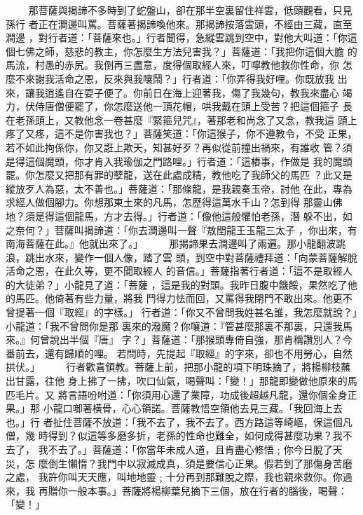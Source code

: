 \begin{pinyinscope}
{　　
那菩薩與揭諦不多時到了蛇盤山，卻在那半空裏留住祥雲，低頭觀看，只見孫行
者正在澗邊叫罵。菩薩著揭諦喚他來。那揭諦按落雲頭，不經由三藏，直至澗邊
，對行者道：「菩薩來也。」行者聞得，急縱雲跳到空中，對他大叫道：「你這
個七佛之師，慈悲的教主，你怎麼生方法兒害我？」菩薩道：「我把你這個大膽
的馬流，村愚的赤尻。我倒再三盡意，度得個取經人來，叮嚀教他救你性命，你
怎麼不來謝我活命之恩，反來與我嚷鬧？」行者道：「你弄得我好哩。你既放我
出來，讓我逍遙自在耍子便了。你前日在海上迎著我，傷了我幾句，教我來盡心
竭力，伏侍唐僧便罷了，你怎麼送他一頂花帽，哄我戴在頭上受苦？把這個箍子
長在老孫頭上，又教他念一卷甚麼『緊箍兒咒』，著那老和尚念了又念，教我這
頭上疼了又疼，這不是你害我也？」菩薩笑道：「你這猴子，你不遵教令，不受
正果，若不如此拘係你，你又誑上欺天，知甚好歹？再似從前撞出禍來，有誰收
管？須是得這個魔頭，你才肯入我瑜伽之門路哩。」行者道：「這樁事，作做是
我的魔頭罷。你怎麼又把那有罪的孽龍，送在此處成精，教他吃了我師父的馬匹
？此又是縱放歹人為惡，太不善也。」菩薩道：「那條龍，是我親奏玉帝，討他
在此，專為求經人做個腳力。你想那東土來的凡馬，怎歷得這萬水千山？怎到得
那靈山佛地？須是得這個龍馬，方才去得。」行者道：「像他這般懼怕老孫，潛
躲不出，如之奈何？」菩薩叫揭諦道：「你去澗邊叫一聲『敖閏龍王玉龍三太子
，你出來，有南海菩薩在此。』他就出來了。」
　　
那揭諦果去澗邊叫了兩遍。那小龍翻波跳浪，跳出水來，變作一個人像，踏了雲
頭，到空中對菩薩禮拜道：「向蒙菩薩解脫活命之恩，在此久等，更不聞取經人
的音信。」菩薩指著行者道：「這不是取經人的大徒弟？」小龍見了道：「菩薩
，這是我的對頭。我昨日腹中饑餒，果然吃了他的馬匹。他倚著有些力量，將我
鬥得力怯而回，又罵得我閉門不敢出來。他更不曾提著一個『取經』的字樣。」
行者道：「你又不曾問我姓甚名誰，我怎麼就說？」小龍道：「我不曾問你是那
裏來的潑魔？你嚷道：『管甚麼那裏不那裏，只還我馬來。』何曾說出半個『唐』
字？」菩薩道：「那猴頭專倚自強，那肯稱讚別人？今番前去，還有歸順的哩。
若問時，先提起『取經』的字來，卻也不用勞心，自然拱伏。」
　　
行者歡喜領教。菩薩上前，把那小龍的項下明珠摘了，將楊柳枝蘸出甘露，往他
身上拂了一拂，吹口仙氣，喝聲叫：「變！」那龍即變做他原來的馬匹毛片。又
將言語吩咐道：「你須用心還了業障，功成後超越凡龍，還你個金身正果。」那
小龍口啣著橫骨，心心領諾。菩薩教悟空領他去見三藏。「我回海上去也。」行
者扯住菩薩不放道：「我不去了，我不去了。西方路這等崎嶇，保這個凡僧，幾
時得到？似這等多磨多折，老孫的性命也難全，如何成得甚麼功果？我不去了，
我不去了。」菩薩道：「你當年未成人道，且肯盡心修悟﹔你今日脫了天災，怎
麼倒生懶惰？我門中以寂滅成真，須是要信心正果。假若到了那傷身苦磨之處，
我許你叫天天應，叫地地靈﹔十分再到那難脫之際，我也親來救你。你過來，我
再贈你一般本事。」菩薩將楊柳葉兒摘下三個，放在行者的腦後，喝聲：「變！」
}
\end{pinyinscope}

